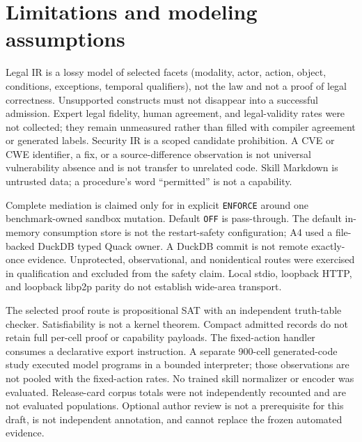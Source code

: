 \section{Limitations and modeling assumptions}
\label{sec:limits}

Legal IR is a lossy model of selected facets (modality, actor, action, object, conditions, exceptions, temporal qualifiers), not the law and not a proof of legal correctness. Unsupported constructs must not disappear into a successful admission. Expert legal fidelity, human agreement, and legal-validity rates were not collected; they remain unmeasured rather than filled with compiler agreement or generated labels. Security IR is a scoped candidate prohibition. A CVE or CWE identifier, a fix, or a source-difference observation is not universal vulnerability absence and is not transfer to unrelated code. Skill Markdown is untrusted data; a procedure's word ``permitted'' is not a capability.

Complete mediation is claimed only for  in explicit \texttt{ENFORCE} around one benchmark-owned  sandbox mutation. Default \texttt{OFF} is pass-through. The default in-memory consumption store is not the restart-safety configuration; A4 used a file-backed DuckDB typed Quack owner. A DuckDB commit is not remote exactly-once evidence. Unprotected, observational, and nonidentical routes were exercised in qualification and excluded from the safety claim. Local stdio, loopback HTTP, and loopback libp2p parity do not establish wide-area transport.

The selected proof route is propositional SAT with an independent truth-table checker. Satisfiability is not a kernel theorem. Compact admitted records do not retain full per-cell proof or capability payloads. The fixed-action handler consumes a declarative export instruction. A separate 900-cell generated-code study executed model programs in a bounded interpreter; those observations are not pooled with the fixed-action rates. No trained skill normalizer or encoder was evaluated. Release-card corpus totals were not independently recounted and are not evaluated populations. Optional author review is not a prerequisite for this draft, is not independent annotation, and cannot replace the frozen automated evidence.

